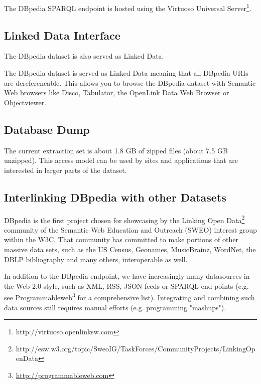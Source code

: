 \documentclass{llncs}
\begin{document}
The DBpedia SPARQL endpoint is hosted using the Virtuoso Universal Server\footnote{http://virtuoso.openlinksw.com}.

\subsection{Linked Data Interface}

The DBpedia dataset is also served as Linked Data\cite{TimLinkedData}. 

The DBpedia dataset is served as Linked Data meaning that all DBpedia URIs are dereferencable. This allows you to browse the DBpedia dataset with Semantic Web browsers like Disco, Tabulator, the OpenLink Data Web Browser or Objectviewer.


\subsection{Database Dump}

The current extraction set is about 1.8 GB of zipped files (about 7.5 GB unzipped).
This access model can be used by sites and applications that are interested in larger parts of the dataset.
 
\subsection{Interlinking DBpedia with other Datasets}

DBpedia is the first project chosen for showcasing by the Linking Open Data\footnote{http://esw.w3.org/topic/SweoIG/TaskForces/CommunityProjects/LinkingOpenData} community of the Semantic Web Education and Outreach (SWEO) interest group within the W3C. That community has committed to make portions of other massive data sets, such as the US Census, Geonames, MusicBrainz, WordNet, the DBLP bibliography and many others, interoperable as well.


In addition to the DBpedia endpoint, we have increasingly many datasources in the Web 2.0 style, such as XML, RSS, JSON feeds or SPARQL end-points (e.g. see Programmableweb\footnote{\url{http://programmableweb.com}} for a comprehensive list). Integrating and combining such data sources still requires manual efforts (e.g. programming "mashups").
\end{document}
